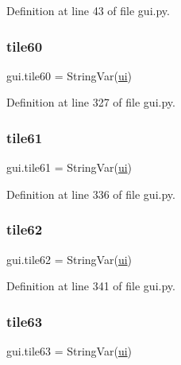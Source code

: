 Definition at line 43 of file gui.\+py.

\mbox{\label{namespacegui_ab03da7520cb8fba94a7355a29961a27c}} 
\subsubsection{\texorpdfstring{tile60}{tile60}}
{\footnotesize\ttfamily gui.\+tile60 = String\+Var(\mbox{\hyperlink{namespacegui_a40ab7281456eadbea2dc2038f5c24fa1}{ui}})}



Definition at line 327 of file gui.\+py.

\mbox{\label{namespacegui_a72aee8d939c765161a5aae9a00f1eaa9}} 
\subsubsection{\texorpdfstring{tile61}{tile61}}
{\footnotesize\ttfamily gui.\+tile61 = String\+Var(\mbox{\hyperlink{namespacegui_a40ab7281456eadbea2dc2038f5c24fa1}{ui}})}



Definition at line 336 of file gui.\+py.

\mbox{\label{namespacegui_a13b3be2d7f981617df137af52770951f}} 
\subsubsection{\texorpdfstring{tile62}{tile62}}
{\footnotesize\ttfamily gui.\+tile62 = String\+Var(\mbox{\hyperlink{namespacegui_a40ab7281456eadbea2dc2038f5c24fa1}{ui}})}



Definition at line 341 of file gui.\+py.

\mbox{\label{namespacegui_ad42c2e1d85c862f7218f07791aad0d8a}} 
\subsubsection{\texorpdfstring{tile63}{tile63}}
{\footnotesize\ttfamily gui.\+tile63 = String\+Var(\mbox{\hyperlink{namespacegui_a40ab7281456eadbea2dc2038f5c24fa1}{ui}})}



